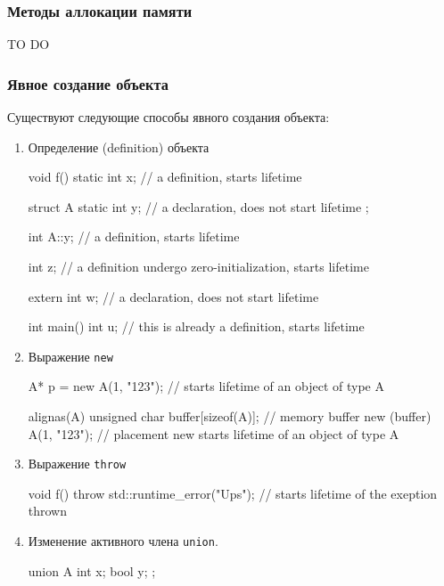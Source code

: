 \documentclass{article}
\begin{document}
\subsubsection{Методы аллокации памяти}
\label{section::MemoryAllocation}

TO DO

\subsubsection{Явное создание объекта}

Существуют следующие способы явного создания объекта:
\begin{enumerate}
\item Определение (definition) объекта
\begin{cppcode}[numbers = none]
void f() {
  static int x; // a definition, starts lifetime
}

struct A {
  static int y; // a declaration, does not start lifetime
};

int A::y;       // a definition, starts lifetime

int z;          // a definition undergo zero-initialization, starts lifetime

extern int w;   // a declaration, does not start lifetime

int main() {
  int u;        // this is already a definition, starts lifetime
}
\end{cppcode}

\item Выражение \verb"new"
\begin{cppcode}[numbers = none]
A* p = new A(1, "123");   // starts lifetime of an object of type A

alignas(A) unsigned char buffer[sizeof(A)]; // memory buffer
new (buffer) A(1, "123"); // placement new starts lifetime of an object of type A
\end{cppcode}

\item Выражение \verb"throw"
\begin{cppcode}[numbers = none]
void f() {
  throw std::runtime_error("Ups"); // starts lifetime of the exeption thrown
}
\end{cppcode}

\item Изменение активного члена \verb"union".
\begin{cppcode}[numbers = none]
union A {
  int x;
  bool y;
};


\end{cppcode}
\end{enumerate}
\end{document}
